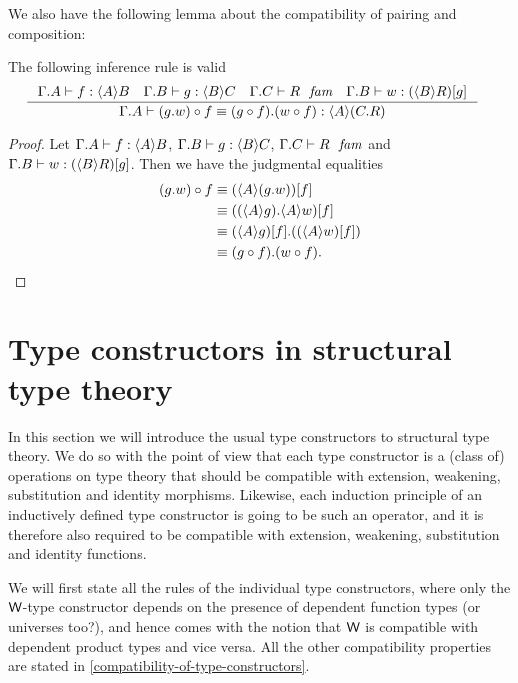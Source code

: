 We also have the following lemma about the compatibility of pairing and composition:

\begin{lem}
The following inference rule is valid
\begin{align*}
& \inference
  {\jhom{\Gamma}{A}{B}{f}
   \jhom{\Gamma}{B}{C}{g}
   \jfam{{\Gamma}{C}}{R}
   \jterm{{\Gamma}{B}}{\subst{g}{\ctxwk{B}{R}}}{w}}
  {\jhomeq{\Gamma}{A}{{C}{R}}
    {\jcomp{f}{\ctxext{g}{w}}}
    {\ctxext{\jcomp{f}{g}}{\jcomp{f}{w}}}}
\end{align*}
\end{lem}

\begin{proof}
Let $\jhom{\Gamma}{A}{B}{f}$, $\jhom{\Gamma}{B}{C}{g}$, $\jfam{{\Gamma}{C}}{R}$
and $\jterm{{\Gamma}{B}}{\subst{g}{\ctxwk{B}{R}}}{w}$. Then we have the
judgmental equalities
\begin{align*}
\jcomp{f}{\ctxext{g}{w}}
& \jdeq \subst{f}{\ctxwk{A}{\ctxext{g}{w}}}\\
& \jdeq \subst{f}{\ctxext{\ctxwk{A}{g}}{\ctxwk{A}{w}}}\\
& \jdeq \ctxext{\subst{f}{\ctxwk{A}{g}}}{\subst{f}{\ctxwk{A}{w}}}\\
& \jdeq \ctxext{\jcomp{f}{g}}{\jcomp{f}{w}}.
\end{align*}
\end{proof}
%

\section{Type constructors in structural type theory}
In this section we will introduce the usual type constructors to structural
type theory. We do so with the point of view that each type constructor is a
(class of) operations on type theory that should be compatible with extension,
weakening, substitution and identity morphisms. Likewise, each induction
principle of an inductively defined type constructor is going to be such an
operator, and it is therefore also required to be compatible with extension,
weakening, substitution and identity functions.

We will first state all the rules of the individual type constructors, where
only the ${\mathsf{W}}$-type constructor depends on the presence of dependent
function types (or universes too?), and hence comes with the notion that ${\mathsf{W}}$
is compatible with dependent product types and vice versa. All the other
compatibility properties are stated in \autoref{compatibility-of-type-constructors}.

